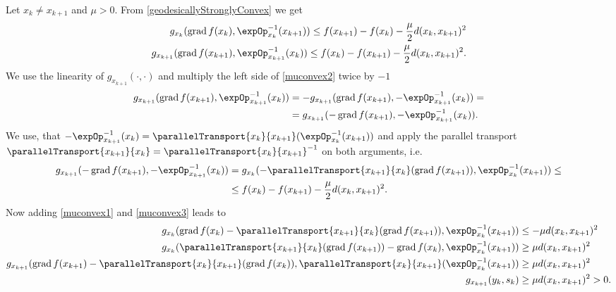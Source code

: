 Let $x_k \neq x_{k+1}$ and $\mu > 0$. From \cref{geodesicallyStronglyConvex} we get 
\begin{align}
    g_{x_k} (\operatorname{grad} f(x_k), {\expOp}^{-1}_{x_k}(x_{k+1})) \leq f(x_{k+1}) - f(x_k) - \frac{\mu}{2} d(x_k,x_{k+1})^2 \label{muconvex1} \\ 
    g_{x_{k+1}} (\operatorname{grad} f(x_{k+1}), {\expOp}^{-1}_{x_{k+1}}(x_k)) \leq f(x_k) - f(x_{k+1}) - \frac{\mu}{2} d(x_k,x_{k+1})^2. \label{muconvex2}
\end{align}
We use the linearity of $g_{x_{k+1}}(\cdot, \cdot)$ and multiply the left side of \cref{muconvex2} twice by $-1$ 
\begin{equation*}
    \begin{split}
        g_{x_{k+1}} (\operatorname{grad} f(x_{k+1}), {\expOp}^{-1}_{x_{k+1}}(x_k)) & = - g_{x_{k+1}} (\operatorname{grad} f(x_{k+1}), -{\expOp}^{-1}_{x_{k+1}}(x_k)) = \\ & = g_{x_{k+1}} ( - \operatorname{grad} f(x_{k+1}), - {\expOp}^{-1}_{x_{k+1}}(x_k)).
    \end{split}
\end{equation*}
We use, that $-{\expOp}^{-1}_{x_{k+1}}(x_k) = \parallelTransport{x_k}{x_{k+1}} ({\expOp}^{-1}_{x_k}(x_{k+1}))$ and apply the parallel transport $\parallelTransport{x_{k+1}}{x_k} = {\parallelTransport{x_k}{x_{k+1}}}^{-1}$ on both arguments, i.e. 
\begin{equation}\label{muconvex3}
    \begin{split}
        g_{x_{k+1}} ( - \operatorname{grad} f(x_{k+1}), - {\expOp}^{-1}_{x_{k+1}}(x_k)) & = g_{x_k} ( - \parallelTransport{x_{k+1}}{x_k} (\operatorname{grad} f(x_{k+1})), {\expOp}^{-1}_{x_k}(x_{k+1})) \leq \\
        & \leq f(x_k) - f(x_{k+1}) - \frac{\mu}{2} d(x_k,x_{k+1})^2.
    \end{split}
\end{equation}
Now adding \cref{muconvex1} and \cref{muconvex3} leads to 
\begin{equation*}
    \begin{split}
        g_{x_k} ( \operatorname{grad} f(x_k) - \parallelTransport{x_{k+1}}{x_k} (\operatorname{grad} f(x_{k+1})), {\expOp}^{-1}_{x_k}(x_{k+1})) & \leq - \mu d(x_k,x_{k+1})^2 \\
        g_{x_k} ( \parallelTransport{x_{k+1}}{x_k} (\operatorname{grad} f(x_{k+1})) - \operatorname{grad} f(x_k), {\expOp}^{-1}_{x_k}(x_{k+1})) & \geq \mu d(x_k,x_{k+1})^2 \\
        g_{x_{k+1}} ( \operatorname{grad} f(x_{k+1}) - \parallelTransport{x_k}{x_{k+1}} (\operatorname{grad} f(x_k)), \parallelTransport{x_k}{x_{k+1}}( {\expOp}^{-1}_{x_k}(x_{k+1})) & \geq \mu d(x_k,x_{k+1})^2 \\
        g_{x_{k+1}} ( y_k, s_k) & \geq \mu d(x_k,x_{k+1})^2 > 0.
    \end{split}
\end{equation*}
